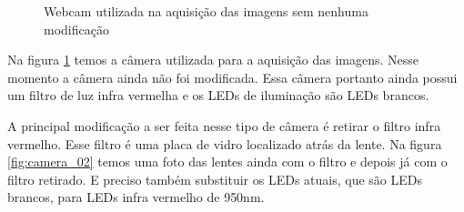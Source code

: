 \begin{figure}[ht!]
	\centering
	\setlength{\fboxsep}{1pt}
  	\caption{Webcam utilizada na aquisição das imagens sem nenhuma modificação}
  	\label{fig:camera_01}
\end{figure}


Na figura \ref{fig:camera_01} temos a câmera utilizada para a aquisição das imagens. Nesse momento a câmera ainda não foi modificada. Essa câmera portanto ainda possui um filtro de luz infra vermelha e os LEDs de iluminação são LEDs brancos.

A principal modificação a ser feita nesse tipo de câmera é retirar o filtro infra vermelho. Esse filtro é uma placa de vidro localizado atrás da lente. Na figura \ref{fig:camera_02} temos uma foto das lentes ainda com o filtro e depois já com o filtro retirado. E preciso também substituir os LEDs atuais, que são LEDs brancos, para LEDs infra vermelho de 950nm.

